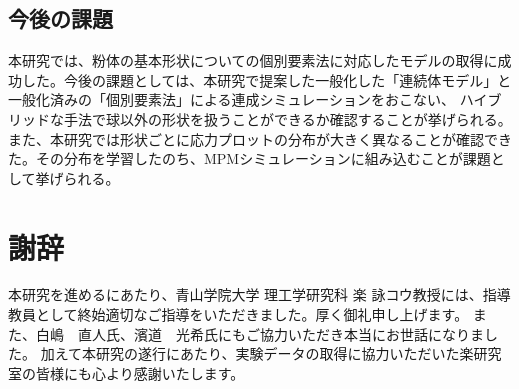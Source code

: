 \documentclass[12pt]{ltjsarticle}
\begin{document}
\subsection{今後の課題}
本研究では、粉体の基本形状についての個別要素法に対応したモデルの取得に成功した。今後の課題としては、本研究で提案した一般化した「連続体モデル」と一般化済みの「個別要素法」による連成シミュレーションをおこない、
ハイブリッドな手法で球以外の形状を扱うことができるか確認することが挙げられる。\\
また、本研究では形状ごとに応力プロットの分布が大きく異なることが確認できた。その分布を学習したのち、MPMシミュレーションに組み込むことが課題として挙げられる。

\clearpage

\section*{謝辞}
本研究を進めるにあたり、青山学院大学 理工学研究科 楽 詠コウ教授には、指導教員として終始適切なご指導をいただきました。厚く御礼申し上げます。
また、白嶋　直人氏、濱道　光希氏にもご協力いただき本当にお世話になりました。
加えて本研究の遂行にあたり、実験データの取得に協力いただいた楽研究室の皆様にも心より感謝いたします。

\newpage
\end{document}
